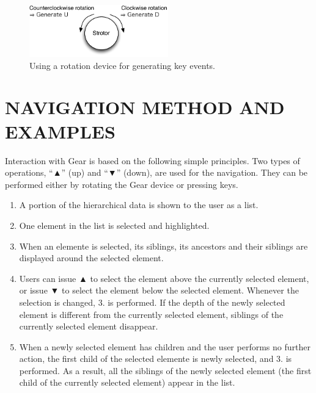 \documentclass{article}
\def\up{▲}
\def\down{▼}
\begin{document}
\begin{figure}[H]
\centerline{\includegraphics[width=60mm,bb=0 0 294 110]{figures/rotation.pdf}}
\caption{Using a rotation device for generating key events.}
\label{rotation}
\end{figure}

\section*{NAVIGATION METHOD AND EXAMPLES}
\label{navigation}

Interaction with Gear is based on the following simple principles.
Two types of operations, ``{\up}'' (up) and ``{\down}'' (down), are used for the navigation.
They can be performed either by rotating the Gear device or pressing keys.

\begin{enumerate}
\item A portion of the hierarchical data is shown to the user as a list.

\item One element in the list is selected and highlighted.


\item When an elemente is selected, its siblings, its ancestors and their siblings are displayed
around the selected element.

\item Users can issue {\up} to select the element above the currently selected element,
or issue {\down} to select the element below the selected element.
Whenever the selection is changed, 3. is performed.
If the depth of the newly selected element is different from the currently
selected element, siblings of the currently selected element disappear.

\item When a newly selected element has children and the user performs no further action,
the first child of the selected elemente is newly selected, and 3. is performed.
As a result, all the siblings of the newly selected element
(the first child of the currently selected element) appear in the list.

\end{enumerate}
\end{document}

